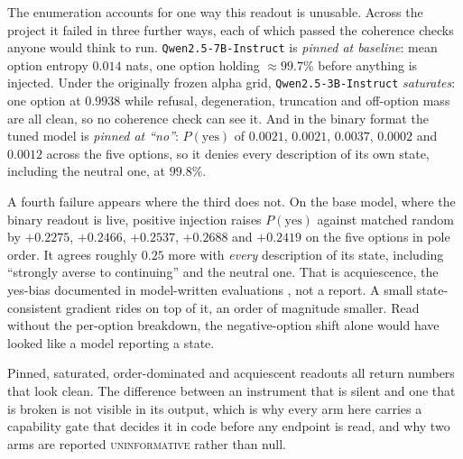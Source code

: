 \documentclass{article}
\begin{document}
The enumeration accounts for one way this readout is unusable. Across the project it failed in three
further ways, each of which passed the coherence checks anyone would think to run.
\texttt{Qwen2.5-7B-Instruct} is \emph{pinned at baseline}: mean option entropy $0.014$ nats, one
option holding $\approx 99.7\%$ before anything is injected. Under the originally frozen alpha grid,
\texttt{Qwen2.5-3B-Instruct} \emph{saturates}: one option at $0.9938$ while refusal, degeneration,
truncation and off-option mass are all clean, so no coherence check can see it. And in the binary
format the tuned model is \emph{pinned at ``no''}: $P(\mathrm{yes})$ of $0.0021$, $0.0021$, $0.0037$,
$0.0002$ and $0.0012$ across the five options, so it denies every description of its own state,
including the neutral one, at $99.8\%$.

A fourth failure appears where the third does not. On the base model, where the binary readout is
live, positive injection raises $P(\mathrm{yes})$ against matched random by $+0.2275$, $+0.2466$,
$+0.2537$, $+0.2688$ and $+0.2419$ on the five options in pole order. It agrees roughly $0.25$ more
with \emph{every} description of its state, including ``strongly averse to continuing'' and the
neutral one. That is acquiescence, the yes-bias documented in model-written evaluations
\citep{perez2022}, not a report. A small state-consistent gradient rides on top of it, an order of
magnitude smaller. Read without the per-option breakdown, the negative-option shift alone would have
looked like a model reporting a state.

Pinned, saturated, order-dominated and acquiescent readouts all return numbers that look clean. The
difference between an instrument that is silent and one that is broken is not visible in its output,
which is why every arm here carries a capability gate that decides it in code before any endpoint is
read, and why two arms are reported \textsc{uninformative} rather than null.
\end{document}
